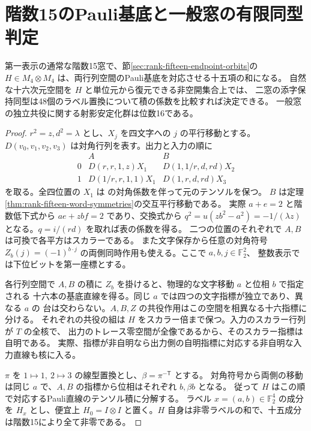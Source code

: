 \section{階数15のPauli基底と一般窓の有限同型判定}
\label{sec:rank-fifteen-pauli-comparison}
\begin{theorem}\label{thm:rank-fifteen-pauli-comparison}
第一表示の通常な階数15窓で、節\ref{sec:rank-fifteen-endpoint-orbits}の
$H\in M_4\otimes M_4$ は、両行列空間のPauli基底を対応させる十五項の和になる。
自然な十六次元空間を $H$ と単位元から復元できる非空開集合上では、
二窓の添字保持同型は48個のラベル置換について積の係数を比較すれば決定できる。
一般窓の独立共役に関する射影安定化群は位数16である。
\end{theorem}
\begin{proof}
$r^2=z,d^2=\lambda$ とし、$X_j$ を四文字への $j$ の平行移動とする。
$D(v_0,v_1,v_2,v_3)$ は対角行列を表す。出力と入力の順に
\[
 \begin{array}{c|cc}
     & A & B\\\hline
 0&D(r,r,1,z)X_1&D(1,1/r,d,rd)X_2\\
 1&D(1/r,r,1,1)X_1&D(1,r,d,rd)X_3
 \end{array}
\]
を取る。全四位置の $X_1$ は
 の対角係数を伴って元のテンソルを保つ。
$B$ は定理\ref{thm:rank-fifteen-word-symmetries}の交互平行移動である。
実際 $a+e=2$ と階数低下式から $ae+zbf=2$ であり、交換式から
$q^2=u(zb^2-a^2)=-1/(\lambda z)$ となる。$q=i/(rd)$ を取れば表の係数を得る。
二つの位置のそれぞれで $A,B$ は可換で各平方はスカラーである。
また文字保存から任意の対角符号
$Z_b(j)=(-1)^{b\cdot j}$ の両側同時作用も使える。ここで $a,b,j\in\mathbb F_2^2$、
整数表示では下位ビットを第一座標とする。

各行列空間で $A,B$ の積に $Z_b$ を掛けると、物理的な文字移動 $a$ と位相 $b$ で指定される
十六本の基底直線を得る。同じ $a$ では四つの文字指標が独立であり、異なる $a$ の
台は交わらない。$A,B,Z$ の共役作用はこの空間を相異なる十六指標に分ける。
それぞれの共役の組は $H$ をスカラー倍まで保つ。入力のスカラー行列が $T$ の全核で、
出力のトレース零空間が全像であるから、そのスカラー指標は自明である。
実際、指標が非自明なら出力側の自明指標に対応する非自明な入力直線も核に入る。

$\pi$ を $1\mapsto1,\ 2\mapsto3$ の線型置換とし、$\beta=\pi^{-\mathsf T}$ とする。
対角符号から両側の移動は同じ $a$ で、$A,B$ の指標から位相はそれぞれ $b,\beta b$ となる。
従って $H$ はこの順で対応するPauli直線のテンソル積に分解する。
ラベル $x=(a,b)\in\mathbb F_2^4$ の成分を $H_x$ とし、便宜上
$H_0=I\otimes I$ と置く。$H$ 自身は非零ラベルの和で、十五成分は階数15により全て非零である。


\end{proof}
